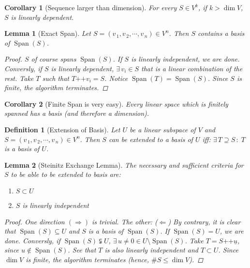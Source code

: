 \documentclass[12pt]{article}
\let\RA\Rightarrow
\let\LA\Leftarrow
\newcommand{\Exist}[1]{\exists\,{#1}\,:\;}
\newcommand{\tuple}[1]{\underline{#1}}
\newcommand{\seq}[2]{\left({#1}_{\,1},{#1}_{\,2},\cdots,{#1}_{\,#2}\right)}
\DeclareMathOperator{\Span}{Span}
\DeclareMathOperator{\concat}{++}
\newtheorem{definition}{Definition}[subsection]
\newtheorem{lemma}{Lemma}[subsection]
\newtheorem{corollary}{Corollary}[subsection]
\begin{document}
\begin{corollary}[Sequence larger than dimension]
  For every $S\in V^k$, if $k>\dim V$, $S$ is linearly dependent.
\end{corollary}

\begin{lemma}[Exact Span]
  Let $S=\seq{v}{n}\in V^n$. Then $S$ contains a basis of $\Span(S)$.
  \begin{proof}
    $S$ of course spans $\Span(S)$. If $S$ is linearly independent, we are done. Conversly, if $S$ is linearly dependent, $\exists \,v_i\in S$ that is a linear combination of the rest. Take $T$ such that $T\concat v_i=S$. Notice $\Span(T)=\Span(S)$. Since $S$ is finite, the algorithm terminates.
  \end{proof}
\end{lemma}

\begin{corollary}[Finite Span is very easy]
  Every linear space which is finitely spanned has a basis (and therefore a dimension).
\end{corollary}

\begin{definition}[Extension of Basis]
  Let $U$ be a linear subspace of $V$ and $S=\seq{v}{n}\in V^n$. Then $S$ can be extended to a basis of $U$ iff: $\Exist{T\supseteq S} T$ is a basis of $U$.
\end{definition}

\pagebreak

\begin{lemma}[Steinitz Exchange Lemma]
  The necessary and sufficient criteria for $S$ to be able to be extended to basis are:
  \begin{enumerate}
    \item $S\subset U$
    \item $S$ is linearly independent
  \end{enumerate}
  \begin{proof}
    One direction $(\RA)$ is trivial. The other: ($\LA$) By contrary, it is clear that $\Span(S)\subseteq U$ and $S$ is a basis of $\Span(S)$. If $\Span(S)=U$, we are done. Conversly, if $\Span(S)\subsetneqq U$, $\exists \,u\neq 0\in U\setminus\Span(S)$. Take $T=S\concat\tuple{u}$, since $u\notin\Span(S)$. See that $T$ is also linearly independent and $T\subset U$. Since $\dim V$ is finite, the algorithm terminates (hence, $\# S\leq \dim V$).
  \end{proof}
\end{lemma}
\end{document}
